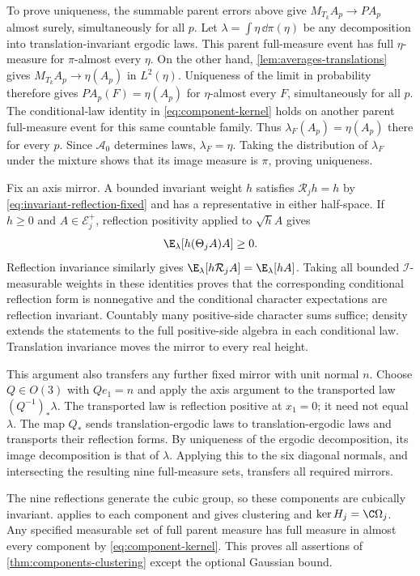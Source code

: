 To prove uniqueness, the summable parent errors above give
$M_{T_k}A_p\to PA_p$ almost surely, simultaneously for all $p$.
Let $\lambda=\int\eta\,\dd\pi(\eta)$ be any decomposition into
translation-invariant ergodic laws. This parent full-measure event
has full $\eta$-measure for $\pi$-almost every $\eta$.
On the other hand, \cref{lem:averages-translations} gives
$M_{T_k}A_p\to\eta(A_p)$ in $L^2(\eta)$.
Uniqueness of the limit in probability therefore gives
$PA_p(F)=\eta(A_p)$ for $\eta$-almost every $F$, simultaneously
for all $p$. The conditional-law identity in
\eqref{eq:component-kernel} holds on another parent full-measure
event for this same countable family. Thus
$\lambda_F(A_p)=\eta(A_p)$ there for every $p$.
Since $\mathcal A_0$ determines laws, $\lambda_F=\eta$.
Taking the distribution of $\lambda_F$ under the mixture shows
that its image measure is $\pi$, proving uniqueness.

Fix an axis mirror. A bounded invariant weight $h$ satisfies
$\mathcal R_jh=h$ by \eqref{eq:invariant-reflection-fixed} and has a
representative in either half-space. If $h\ge0$ and
$A\in\mathcal E_j^+$, reflection positivity applied to $\sqrt hA$
gives
\begin{equation}\label{eq:weighted-component-rp}
 \E_\lambda[h(\Theta_jA)A]\ge0.
\end{equation}
Reflection invariance similarly gives
$\E_\lambda[h\mathcal R_jA]=\E_\lambda[hA]$.
Taking all bounded $\mathcal I$-measurable weights in these identities
proves that the corresponding conditional reflection form is
nonnegative and the conditional character expectations are reflection
invariant. Countably many positive-side character sums suffice;
density extends the statements to the full positive-side algebra
in each conditional law. Translation invariance moves the mirror
to every real height.

This argument also transfers any further fixed mirror with unit normal $n$.
Choose $Q\in O(3)$ with $Qe_1=n$ and apply the axis argument to
the transported law $(Q^{-1})_*\lambda$. The transported law is
reflection positive at $x_1=0$; it need not equal $\lambda$.
The map $Q_*$ sends translation-ergodic laws to translation-ergodic
laws and transports their reflection forms. By uniqueness of the
ergodic decomposition, its image decomposition is that of $\lambda$.
Applying this to the six diagonal normals, and intersecting the
resulting nine full-measure sets, transfers all required mirrors.

The nine reflections generate the cubic group, so these components
are cubically invariant.  applies
to each component and gives clustering and
$\ker H_j=\C\Omega_j$. Any specified measurable set of full parent
measure has full measure in almost every component by
\eqref{eq:component-kernel}. This proves all assertions of
\cref{thm:components-clustering} except the optional Gaussian bound.

